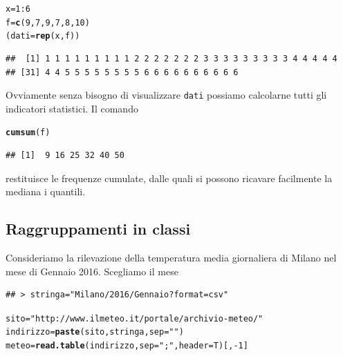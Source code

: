 \documentclass[onecolumn,12pt]{book}\usepackage[]{graphicx}\usepackage[]{color}
\makeatletter
\newcommand{\hlnum}[1]{\textcolor[rgb]{0.686,0.059,0.569}{#1}}%
\newcommand{\hlstr}[1]{\textcolor[rgb]{0.192,0.494,0.8}{#1}}%
\newcommand{\hlopt}[1]{\textcolor[rgb]{0,0,0}{#1}}%
\newcommand{\hlstd}[1]{\textcolor[rgb]{0.345,0.345,0.345}{#1}}%
\newcommand{\hlkwb}[1]{\textcolor[rgb]{0.69,0.353,0.396}{#1}}%
\newcommand{\hlkwc}[1]{\textcolor[rgb]{0.333,0.667,0.333}{#1}}%
\newcommand{\hlkwd}[1]{\textcolor[rgb]{0.737,0.353,0.396}{\textbf{#1}}}%
\newenvironment{kframe}{%
 \def\at@end@of@kframe{}%
 \ifinner\ifhmode%
  \def\at@end@of@kframe{\end{minipage}}%
  \begin{minipage}{\columnwidth}%
 \fi\fi%
 \def\FrameCommand##1{\hskip\@totalleftmargin \hskip-\fboxsep
 \colorbox{shadecolor}{##1}\hskip-\fboxsep
     \hskip-\linewidth \hskip-\@totalleftmargin \hskip\columnwidth}%
 \MakeFramed {\advance\hsize-\width
   \@totalleftmargin\z@ \linewidth\hsize
   \@setminipage}}%
 {\par\unskip\endMakeFramed%
 \at@end@of@kframe}
\newenvironment{knitrout}{}{} %
\makeatother
\begin{document}
\begin{knitrout}
\color{fgcolor}\begin{kframe}
\begin{alltt}
\hlstd{x}\hlkwb{=}\hlnum{1}\hlopt{:}\hlnum{6}
\hlstd{f}\hlkwb{=}\hlkwd{c}\hlstd{(}\hlnum{9}\hlstd{,}\hlnum{7}\hlstd{,}\hlnum{9}\hlstd{,}\hlnum{7}\hlstd{,}\hlnum{8}\hlstd{,}\hlnum{10}\hlstd{)}
\hlstd{(dati}\hlkwb{=}\hlkwd{rep}\hlstd{(x,f))}
\end{alltt}
\begin{verbatim}
##  [1] 1 1 1 1 1 1 1 1 1 2 2 2 2 2 2 2 3 3 3 3 3 3 3 3 3 4 4 4 4 4
## [31] 4 4 5 5 5 5 5 5 5 5 6 6 6 6 6 6 6 6 6 6
\end{verbatim}
\end{kframe}
\end{knitrout}
Ovviamente senza bisogno di visualizzare \texttt{dati} possiamo calcolarne tutti gli indicatori statistici.
Il comando
\begin{knitrout}
\color{fgcolor}\begin{kframe}
\begin{alltt}
\hlkwd{cumsum}\hlstd{(f)}
\end{alltt}
\begin{verbatim}
## [1]  9 16 25 32 40 50
\end{verbatim}
\end{kframe}
\end{knitrout}
restituisce le frequenze cumulate, dalle quali si possono ricavare facilmente la mediana
i quantili.

\subsection{Raggruppamenti in classi}


Consideriamo la rilevazione della temperatura media giornaliera di Milano nel mese di Gennaio 2016.
Scegliamo il mese
\begin{knitrout}
\color{fgcolor}\begin{kframe}
\begin{verbatim}
## > stringa="Milano/2016/Gennaio?format=csv"
\end{verbatim}
\end{kframe}
\end{knitrout}
\begin{knitrout}
\color{fgcolor}\begin{kframe}
\begin{alltt}
\hlstd{sito}\hlkwb{=}\hlstr{"http://www.ilmeteo.it/portale/archivio-meteo/"}
\hlstd{indirizzo}\hlkwb{=}\hlkwd{paste}\hlstd{(sito,stringa,}\hlkwc{sep}\hlstd{=}\hlstr{""}\hlstd{)}
\hlstd{meteo}\hlkwb{=}\hlkwd{read.table}\hlstd{(indirizzo,}\hlkwc{sep}\hlstd{=}\hlstr{";"}\hlstd{,}\hlkwc{header}\hlstd{=T)[,}\hlopt{-}\hlnum{1}\hlstd{]}
\end{alltt}
\end{kframe}
\end{knitrout}
\end{document}
